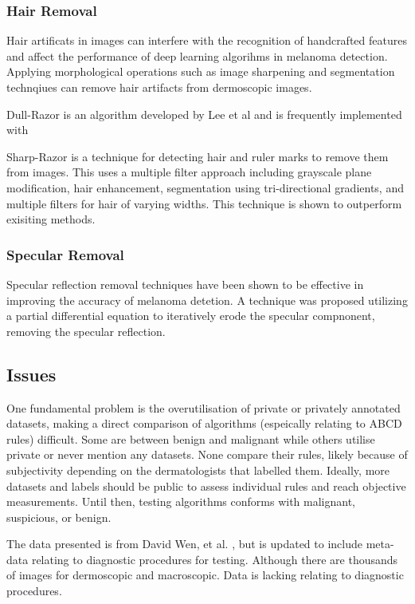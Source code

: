 \subsubsection{Hair Removal}
Hair artificats in images can interfere with the recognition of handcrafted features and affect the performance of deep learning algorihms in melanoma detection\cite{kasmi2023}. Applying morphological operations such as image sharpening and segmentation technqiues can remove hair artifacts from dermoscopic images\cite{kasmi2023}.

Dull-Razor is an algorithm developed by Lee et al\cite{Lee1997} and is frequently implemented with 

Sharp-Razor\cite{kasmi2023} is a technique for detecting hair and ruler marks to remove them from  images. This uses a multiple filter approach including grayscale plane modification, hair enhancement, segmentation using tri-directional gradients, and multiple filters for hair of varying widths. This technique is shown to outperform exisiting methods.

\subsubsection{Specular Removal}
Specular reflection removal techniques have been shown to be effective in improving the accuracy of melanoma detetion\cite{Shen2009}. A technique was proposed utilizing a partial differential equation to iteratively erode the specular compnonent, removing the specular reflection\cite{Shen2009}.


\subsection{Issues}
One fundamental problem is the overutilisation of private or privately annotated datasets, making a direct comparison of algorithms (espeically relating to ABCD rules) difficult. Some are between benign and malignant\cite{Meskini2018, Kasmi2016, Ali2020b, Ali2020a} while others utilise private or never mention any datasets\cite{Kasmi2016, She2007, Tenenhaus2010, Ramezani2014, Zaqout2016}. None compare their rules, likely because of subjectivity depending on the dermatologists that labelled them. Ideally, more datasets and labels should be public to assess individual rules and reach objective measurements. Until then, testing algorithms conforms with malignant, suspicious, or benign.


The data presented is from David Wen, et al. \cite{Wen2022}, but is updated to include meta-data relating to diagnostic procedures for testing. Although there are thousands of images for dermoscopic and macroscopic. Data is lacking relating to diagnostic procedures.